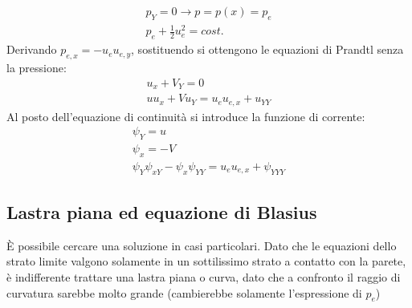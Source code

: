 %
	\begin{equation*}
		\begin{gathered}
			p_Y = 0 \rightarrow p = p(x) = p_e\\
			p_e + \frac{1}{2} u^2_e = cost.
		\end{gathered}
	\end{equation*}
%
Derivando $p_{e,x} = - u_e u_{e,y}$, sostituendo si ottengono le equazioni di Prandtl senza la pressione:
%
	\begin{equation*}
		\begin{gathered}
			u_x + V_Y = 0\\
			u u_x + V u_Y = u_e u_{e,x} + u_{YY}
		\end{gathered}
	\end{equation*}
%
Al posto dell'equazione di continuità si introduce la funzione di corrente:
%
	\begin{equation*}
		\begin{gathered}
			\psi_Y = u\\
			\psi_x = - V\\
			\psi_Y \psi_{xY} - \psi_{x} \psi_{YY} = u_e u_{e,x} + \psi_{YYY}
		\end{gathered}
	\end{equation*}
%

\subsection{Lastra piana ed equazione di Blasius} 
È possibile cercare una soluzione in casi particolari.
Dato che le equazioni dello strato limite valgono solamente in un sottilissimo strato a contatto con la parete, è indifferente trattare una lastra piana o curva, dato che a confronto il raggio di curvatura sarebbe molto grande (cambierebbe solamente l'espressione di $p_e$)


